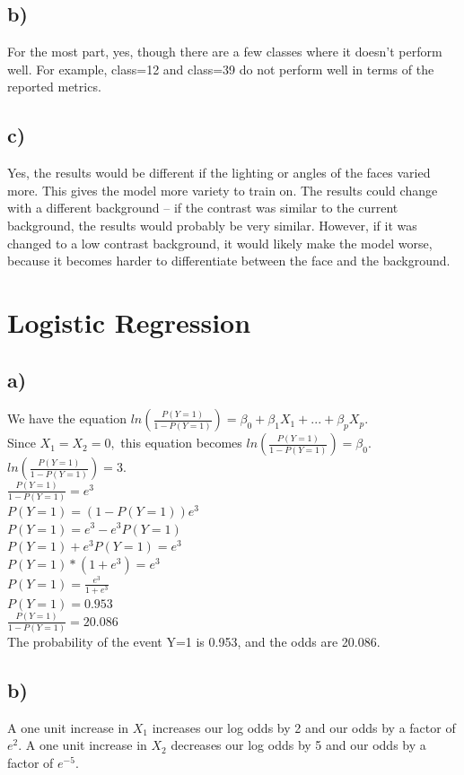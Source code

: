 \documentclass[12pt, letterpaper]{article}
\begin{document}
\subsection*{b)} For the most part, yes, though there are a few classes where it doesn't perform well. For example, class=12 and class=39 do not perform well in terms of the reported metrics.

\subsection*{c)} Yes, the results would be different if the lighting or angles of the faces varied more. This gives the model more variety to train on. The results could change with a different background -- if the contrast was similar to the current background, the results would probably be very similar. However, if it was changed to a low contrast background, it would likely make the model worse, because it becomes harder to differentiate between the face and the background.

\newpage
\section{Logistic Regression}
\subsection*{a)} We have the equation $ln(\frac{P(Y=1)}{1-P(Y=1)}) = \beta_0 + \beta_1X_1 + ... + \beta_pX_p$.\\
Since $X_1 = X_2 = 0,$ this equation becomes $ln(\frac{P(Y=1)}{1-P(Y=1)}) = \beta_0$.\\
$ln(\frac{P(Y=1)}{1-P(Y=1)}) = 3$.\\
$\frac{P(Y=1)}{1-P(Y=1)} = e^3$\\
$P(Y=1) = (1-P(Y=1))e^3$\\
$P(Y=1) = e^3-e^3P(Y=1)$\\
$P(Y=1) + e^3P(Y=1) = e^3$\\
$P(Y=1)*(1 + e^3) = e^3$\\
$P(Y=1) = \frac{e^3}{1 + e^3}$\\
$P(Y=1) = 0.953$\\
$\frac{P(Y=1)}{1-P(Y=1)} = 20.086$\\
The probability of the event Y=1 is 0.953, and the odds are 20.086.\\
\subsection*{b)} A one unit increase in $X_1$ increases our log odds by 2 and our odds by a factor of $e^2$. A one unit increase in $X_2$ decreases our log odds by 5 and our odds by a factor of $e^{-5}$.
\end{document}
